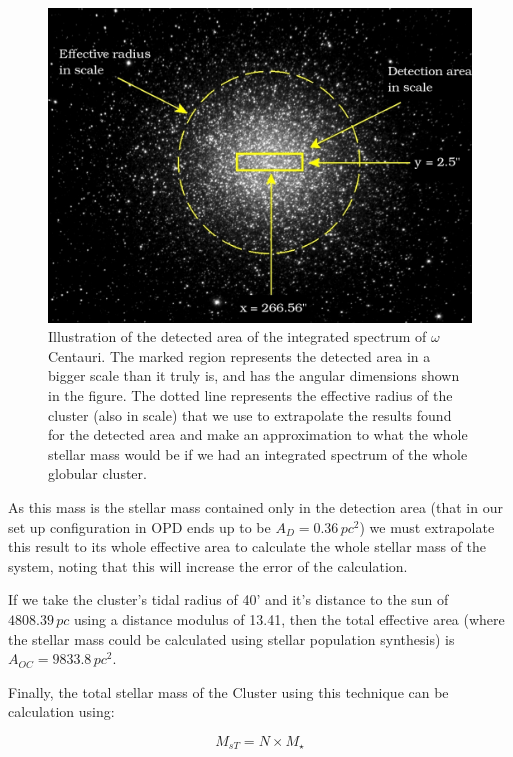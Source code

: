 \begin{figure}[H]
\centering
\includegraphics[width=12cm]{images/OmegaCentauriii.jpg}
\caption[Illustration of the detected area of the integrated spectrum]{Illustration of the detected area of the integrated spectrum of $\omega$ Centauri. The marked region represents the detected area in a bigger scale than it truly is, and has the angular dimensions shown in the figure. The dotted line represents the effective radius of the cluster (also in scale) that we use to extrapolate the results found for the detected area and make an approximation to what the whole stellar mass would be if we had an integrated spectrum of the whole globular cluster.}
\end{figure}

As this mass is the stellar mass contained only in the detection area (that in our set up configuration in OPD ends up to be $A_{D}=0.36\,pc^{2}$) we must extrapolate this result to its whole effective area to calculate the whole stellar mass of the system, noting that this will increase the error of the calculation.

If we take the cluster's tidal radius of 40' and it's distance to the sun of $4808.39\,pc$ using a distance modulus of 13.41, then the total effective area (where the stellar mass could be calculated using stellar population synthesis) is $A_{OC}=9833.8\,pc^{2}$. 

Finally, the total stellar mass of the Cluster using this technique can be calculation using:

\begin{equation}
M_{s T} = N \times M_{\star}
\end{equation}

